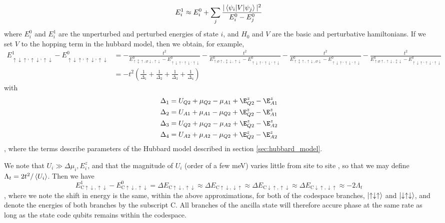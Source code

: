 \documentclass{report}
\begin{document}
\begin{equation*}
    E_i^1 \approx E_i^0 + \sum_j{\frac{|\braket{\psi_i|V|\psi_j}|^2}{E_i^0 - E_j^0}}
\end{equation*} where $E_i^0$ and $E_i^1$ are the unperturbed and perturbed energies of state $i$, and $H_0$ and $V$ are the basic and perturbative hamiltonians. If we set $V$ to the hopping term in the hubbard model, then we obtain, for example,
\begin{align*}
    E_{\uparrow\downarrow\uparrow,\uparrow\downarrow,\uparrow\downarrow}^1 - E_{\uparrow\downarrow\uparrow,\uparrow\downarrow,\uparrow\downarrow}^0 &= 
    -\frac{t^2}{E_{\uparrow\updownarrow \uparrow,\varnothing\downarrow,\uparrow\downarrow}^0 - E_{\uparrow\downarrow\uparrow,\uparrow\downarrow,\uparrow\downarrow}^0}
    -\frac{t^2}{E_{\uparrow\varnothing \uparrow,\updownarrow\downarrow,\uparrow\downarrow}^0 - E_{\uparrow\downarrow\uparrow,\uparrow\downarrow,\uparrow\downarrow}^0}
    -\frac{t^2}{E_{\uparrow\updownarrow \uparrow,\uparrow\downarrow,\varnothing\downarrow}^0 - E_{\uparrow\downarrow\uparrow,\uparrow\downarrow,\uparrow\downarrow}^0}
    -\frac{t^2}{E_{\uparrow\varnothing \uparrow,\uparrow\downarrow,\updownarrow\downarrow}^0 - E_{\uparrow\downarrow\uparrow,\uparrow\downarrow,\uparrow\downarrow}^0}\\
    &= -t^2\left(\frac{1}{\Delta_1} + \frac{1}{\Delta_2} + \frac{1}{\Delta_3}+ \frac{1}{\Delta_4}\right)
\end{align*} with
\begin{align*}
    \Delta_1 &= U_{Q2} + \mu_{Q2} - \mu_{A1} + \E_{Q2}^z - \E_{A1}^z \\
    \Delta_2 &= U_{A1} + \mu_{A1} - \mu_{Q2} + \E_{Q2}^z - \E_{A1}^z \\
    \Delta_3 &= U_{Q2} + \mu_{Q2} - \mu_{A2} + \E_{Q2}^z - \E_{A2}^z \\
    \Delta_4 &= U_{A2} + \mu_{A2} - \mu_{Q2} + \E_{Q2}^z - \E_{A2}^z \\
\end{align*}, where the terms describe parameters of the Hubbard model described in section \ref{sec:hubbard_model}.

We note that $U_i \gg \Delta \mu_i, E^z_i$, and that the magnitude of $U_i$ (order of a few \unit{\milli\electronvolt}) varies little from site to site , so that we may define $\Lambda_t = 2t^2/\braket{U_i}$. Then we have 
\begin{equation*}
    E_{\mathrm{C}\uparrow\downarrow,\uparrow\downarrow}^1 - E_{\mathrm{C}\uparrow\downarrow,\uparrow\downarrow}^0  = \Delta E_{\mathrm{C}\uparrow\downarrow,\uparrow\downarrow} \approx
    \Delta E_{\mathrm{C}\uparrow\downarrow,\downarrow\uparrow} \approx
    \Delta E_{\mathrm{C}\downarrow\uparrow,\uparrow\downarrow} \approx
    \Delta E_{\mathrm{C}\downarrow\uparrow,\downarrow\uparrow} \approx -2\Lambda_t
\end{equation*}, where we note the shift in energy is the same, within the above approximations, for both of the codespace branches, $\ket{\uparrow\downarrow\uparrow}$ and $\ket{\downarrow\uparrow\downarrow}$, and denote the energies of both branches by the subscript C. All branches of the ancilla state will therefore accure phase at the same rate as long as the state code qubits remains within the codespace.
\end{document}

